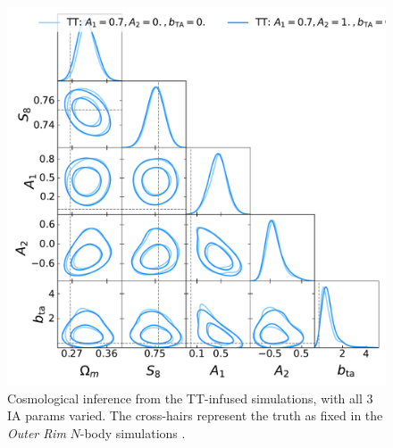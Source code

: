 \begin{figure}
\includegraphics[width=\columnwidth]{graphs/TT_allsweep.pdf}
\caption{Cosmological inference from the TT-infused simulations, with all 3 IA params varied. The cross-hairs represent the truth as fixed in the {\it Outer Rim} $N$-body simulations \citep{OuterRim}.}
\label{fig:triangle_tt_all_ia_params}
\end{figure}


